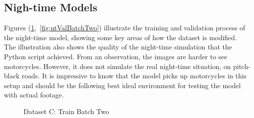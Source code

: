 \documentclass[12pt]{report} %
\begin{document}
		\subsection*{Nigh-time Models}
			Figures (\ref{fig:ntTrainBatchTwo},~\ref{fig:ntValBatchTwo}) illustrate the training and validation process of the night-time model, showing some key areas of how the dataset is modified. The illustration also shows the quality of the night-time simulation that the Python script achieved. From an observation, the images are harder to see motorcycles. However, it does not simulate the real night-time situation, on pitch-black roads. It is impressive to know that the model picks up motorcycles in this setup and should be the following best ideal environment for testing the model with actual footage.
			\begin{figure}[hb]
				\begin{floatrow}
					{
						\caption{Dataset C: Train Batch Two}
						\label{fig:ntTrainBatchTwo}
					}
				

\end{floatrow}
\end{figure}
\end{document}
